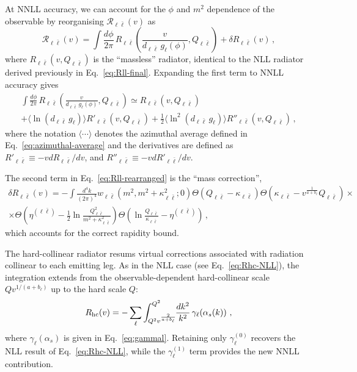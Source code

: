 At NNLL accuracy, we can account for the $\phi$ and $m^2$ dependence of the observable 
by reorganising $\mathcal{R}_{\ell\bar\ell}(v)$ as 
\begin{equation}
\label{eq:Rll-rearranged}
  \mathcal{R}_{\ell\bar\ell}(v) = \int\frac{d\phi}{2\pi}\, R_{\ell\bar \ell}\left(\frac{v}{d_{\ell\bar \ell} \,g_\ell(\phi)},Q_{\ell\bar \ell}\right)+\delta R_{\ell\bar \ell}(v)\,,
\end{equation}
where $R_{\ell\bar\ell}(v,Q_{\ell\bar\ell})$ is the ``massless'' radiator, 
identical to the NLL radiator derived previously in
Eq.~\eqref{eq:Rll-final}. Expanding the first term to NNLL accuracy gives 
\begin{multline}
  \label{eq:Rll-expanded}
\int\frac{d\phi}{2\pi}\, R_{\ell\bar \ell}\left(\frac{v}{d_{\ell\bar \ell} \,g_\ell(\phi)},Q_{\ell\bar \ell}\right)\simeq  
R_{\ell\bar \ell}\left(v,Q_{\ell\bar \ell}\right)\\+\langle \ln(d_{\ell\bar \ell}\,g_\ell)\rangle R'_{\ell\bar \ell}\left(v,Q_{\ell\bar \ell}\right)+\frac 12
\langle \ln^2(d_{\ell\bar \ell}\,g_\ell)\rangle R''_{\ell\bar \ell}\left(v,Q_{\ell\bar \ell}\right)\,,
\end{multline}
where the notation
$\langle\cdots\rangle$ denotes the azimuthal average defined in
Eq.~\eqref{eq:azimuthal-average} and the derivatives are defined as
$R'_{\ell\bar\ell}\equiv-vdR_{\ell\bar\ell}/dv$, and
$R''_{\ell\bar\ell}\equiv-vdR'_{\ell\bar\ell}/dv$.

The second term in Eq.~\eqref{eq:Rll-rearranged} is the ``mass correction'',
\begin{multline}
  \label{eq:dRll}
  \delta R_{\ell\bar\ell}(v) = -\int\frac{d^4
    k}{(2\pi)^4}w_{\ell\bar\ell}(m^2,m^2+\kappa_{\ell\bar\ell}^2;0)
 \Theta(Q_{\ell \bar\ell}-\kappa_{\ell\bar \ell}) \Theta(\kappa_{\ell\bar\ell}-v^{\frac1{a+b_\ell}} Q_{\ell\bar \ell}) \times \\
  \times \Theta\left(\eta^{(\ell\bar \ell)}-\frac 12\ln\frac{Q^2_{\ell\bar
        \ell}}{m^2+\kappa_{\ell\bar \ell}^2}
  \right)\Theta\left(\ln\frac{Q_{\ell\bar
        \ell}}{\kappa_{\ell\bar \ell}}-\eta^{(\ell\bar \ell)}  \right)\,,
\end{multline}
which accounts for the correct rapidity bound.

The hard-collinear radiator resums virtual corrections associated with
radiation collinear to each emitting leg. As in the NLL case (see Eq.~\eqref{eq:Rhc-NLL}),
the integration extends from the observable-dependent hard-collinear scale
$Qv^{1/(a+b_\ell)}$ up to the hard scale $Q$:
\begin{equation}
  \label{eq:Rhc-NNLL}
  R_{\rm hc}(v) =
  -\sum_\ell\int^{Q^2}_{Q^2v^{\frac{2}{a+b_\ell}}}
  \!\!\frac{dk^2}{k^2}\,\gamma_\ell\!\left(\alpha_s(k)\right)\,,
\end{equation}
where $\gamma_\ell(\alpha_s)$ is given in Eq.~\eqref{eq:gammal}. Retaining only
$\gamma_\ell^{(0)}$ recovers the NLL result of
Eq.~\eqref{eq:Rhc-NLL}, while the $\gamma_\ell^{(1)}$ term provides the new
NNLL contribution. 

